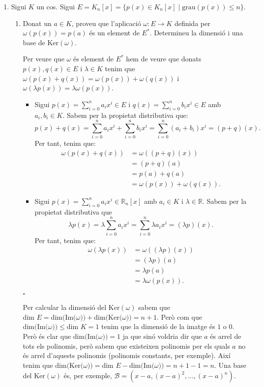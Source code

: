 \documentclass[11pt,a4paper]{article}
\newcommand*{\QED}{\hfill\ensuremath{\square}}
\begin{document}
\begin{enumerate}
\begin{enumerate}
        
    \end{enumerate}
    \item Sigui $K$ un cos. Sigui $E=K_n[x]=\{p(x)\in K_n[x]\mid \text{grau}(p(x))\leq n\}$.
    \begin{enumerate}
        \item Donat un $a\in K$, proveu que l'aplicació $\omega:E\longrightarrow K$ definida per $\omega(p(x))=p(a)$ és un element de $E^*$. Determineu la dimensió i una base de $\text{Ker}(\omega)$.\par
        Per veure que $\omega$ és element de $E^*$ hem de veure que donats $p(x),q(x)\in E$ i $\lambda\in K$ tenim que $\omega(p(x)+q(x))=\omega(p(x))+\omega(q(x))$ i $\omega(\lambda p(x))=\lambda\omega(p(x))$.
        \begin{itemize}
            \item Sigui $p(x)=\sum_{i=0}^na_ix^i\in E$ i $q(x)=\sum_{i=0}^nb_ix^i\in E$ amb $a_i,b_i\in K$. Sabem per la propietat distributiva que: $$p(x)+q(x)=\sum_{i=0}^na_ix^i+\sum_{i=0}^nb_ix^i=\sum_{i=0}^n(a_i+b_i)x^i=(p+q)(x).$$ Per tant, tenim que:
            \begin{align*}
                \omega(p(x)+q(x))&=\omega((p+q)(x))\\
                &=(p+q)(a)\\
                &=p(a)+q(a)\\
                &=\omega(p(x))+\omega(q(x)).
            \end{align*}
            \item Sigui $p(x)=\sum_{i=0}^na_ix^i\in \mathbb{R}_n[x]$ amb $a_i\in K$ i $\lambda\in\mathbb{R}$. Sabem per la propietat distributiva que $$\lambda p(x)=\lambda\sum_{i=0}^na_ix^i=\sum_{i=0}^n\lambda a_ix^i=(\lambda p)(x).$$ Per tant, tenim que:
            \begin{align*}
                \omega(\lambda p(x))&=\omega((\lambda p)(x))\\
                &=(\lambda p)(a)\\
                &=\lambda p(a)\\
                &=\lambda\omega(p(x)).
            \end{align*}
        \end{itemize}
        \QED\par
         Per calcular la dimensió del $\text{Ker}(\omega)$ sabem que $\text{dim }E=\text{dim(Im($\omega$))}+\text{dim(Ker($\omega$))}=n+1$. Però com que $\text{dim(Im($\omega$))}\leq \text{dim } K=1$ tenim que la dimensió de la imatge és $1$ o $0$. Però és clar que $\text{dim(Im($\omega$))}=1$ ja que sinó voldria dir que $a$ és arrel de tots els polinomis, però sabem que existeixen polinomis per els quals $a$ no és arrel d'aquests polinomis (polinomis constants, per exemple). Així tenim que $\text{dim(Ker($\omega$))}=\text{dim }E-\text{dim(Im($\omega$))}=n+1-1=n$. Una base del $\text{Ker}(\omega)$ és, per exemple, $\mathcal{B}=(x-a,(x-a)^2,\ldots,(x-a)^n)$. 

\end{enumerate}
\end{enumerate}
\end{document}
